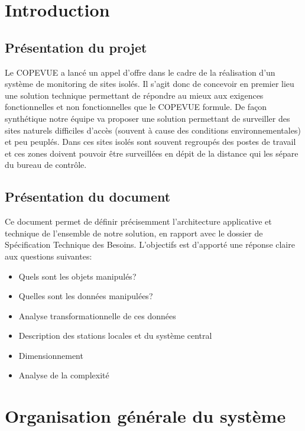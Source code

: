 ﻿\section{Introduction}

\subsection{Présentation du projet}

Le COPEVUE a lancé un appel d'offre dans le cadre de la réalisation d'un système de monitoring de sites isolés. Il s'agit donc de concevoir en premier lieu une solution technique permettant de répondre au mieux aux exigences fonctionnelles et non fonctionnelles que le COPEVUE formule. De façon synthétique notre équipe va proposer une solution permettant de surveiller des sites naturels difficiles d'accès (souvent à cause des conditions environnementales) et peu peuplés. Dans ces sites isolés sont souvent regroupés des postes de travail et ces zones doivent pouvoir être surveillées en dépit de la distance qui les sépare du bureau de contrôle.

\subsection{Présentation du document}

Ce document permet de définir précisemment l'architecture applicative et technique de l'ensemble de notre solution, en rapport avec le dossier de Spécification Technique des Besoins. L'objectifs est d'apporté une réponse claire aux questions suivantes:

\begin{itemize}
	\item Quels sont les objets manipulés?
	\item Quelles sont les données manipulées?
	\item Analyse transformationnelle de ces données
	\item Description des stations locales et du système central
	\item Dimensionnement
	\item Analyse de la complexité
\end{itemize}

\section{Organisation générale du système}


